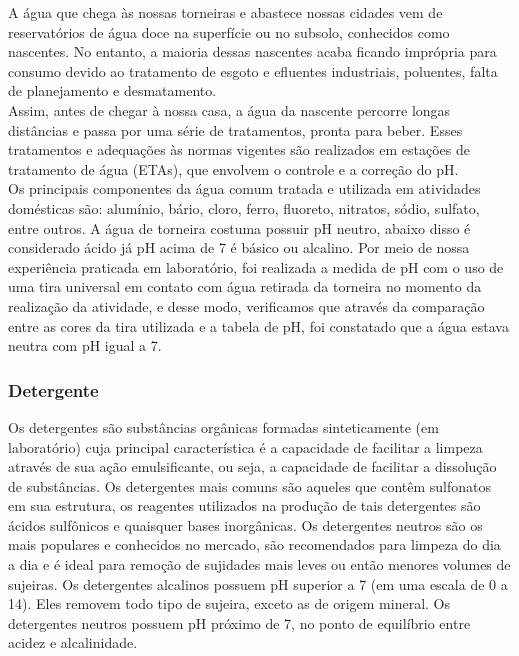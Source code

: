             \indent A água que chega às nossas torneiras e abastece nossas cidades vem de reservatórios de água doce na superfície ou no subsolo, conhecidos como nascentes. No entanto, a maioria dessas nascentes acaba ficando imprópria para consumo devido ao tratamento de esgoto e efluentes industriais, poluentes, falta de planejamento e desmatamento.\\

            \indent Assim, antes de chegar à nossa casa, a água da nascente percorre longas distâncias e passa por uma série de tratamentos, pronta para beber. Esses tratamentos e adequações às normas vigentes são realizados em estações de tratamento de água (ETAs), que envolvem o controle e a correção do pH.\\

            \indent Os principais componentes da água comum tratada e utilizada em atividades domésticas são: alumínio, bário, cloro, ferro, fluoreto, nitratos, sódio, sulfato, entre outros. A água de torneira costuma possuir pH neutro, abaixo disso é considerado ácido já pH acima de 7 é básico ou alcalino. Por meio de nossa experiência praticada em laboratório, foi realizada a medida de pH com o uso de uma tira universal em contato com água retirada da torneira no momento da realização da atividade, e desse modo, verificamos que através da comparação entre as cores da tira utilizada e a tabela de pH, foi constatado que a água estava neutra com pH igual a 7.\\

        \subsubsection{Detergente}\label{exp2:Detergente}

            \indent Os detergentes são substâncias orgânicas formadas sinteticamente (em laboratório) cuja principal característica é a capacidade de facilitar a limpeza através de sua ação emulsificante, ou seja, a capacidade de facilitar a dissolução de substâncias. Os detergentes mais comuns são aqueles que contêm sulfonatos em sua estrutura, os reagentes utilizados na produção de tais detergentes são ácidos sulfônicos e quaisquer bases inorgânicas. Os detergentes neutros são os mais populares e conhecidos no mercado, são recomendados para limpeza do dia a dia e é ideal para remoção de sujidades mais leves ou então menores volumes de sujeiras. Os detergentes alcalinos possuem pH superior a 7 (em uma escala de 0 a 14). Eles removem todo tipo de sujeira, exceto as de origem mineral. Os detergentes neutros possuem pH próximo de 7, no ponto de equilíbrio entre acidez e alcalinidade.\\

